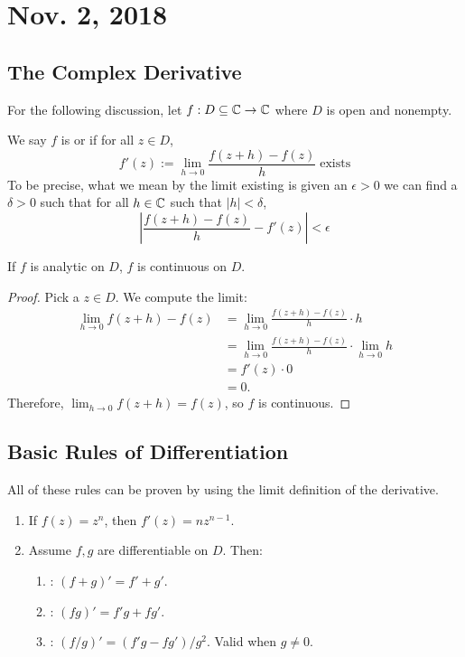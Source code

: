 \documentclass[notes]{subfile}
\begin{document}
\section{Nov. 2, 2018}
\subsection{The Complex Derivative}
For the following discussion, let $f: D \subseteq \operatorname{\mathbb{C}} \to \operatorname{\mathbb{C}}$ where $D$ is open and nonempty.

\begin{definition}
    We say $f$ is  or  if for all $z \in D$,
    \[ f'(z) := \lim_{h \to 0} \frac{f(z+h) - f(z)}{h} \; \text{exists} \]
    To be precise, what we mean by the limit existing is given an $\epsilon > 0$ 
    we can find a $\delta > 0$ such that for all $h \in \operatorname{\mathbb{C}}$ such that $|h| < \delta$,
    \[ \left| \frac{f(z+h) - f(z)}{h} - f'(z) \right| < \epsilon \] 

\end{definition}

\begin{theorem}
    If $f$ is analytic on $D$, $f$ is continuous on $D$.
\end{theorem}

\begin{proof}
    Pick a $z \in D$.
    We compute the limit:
    \begin{align*}
        \lim_{h \to 0} f(z+h) - f(z) &= \lim_{h\to 0} \frac{f(z+h)-f(z)}{h} \cdot h \\
        &= \lim_{h \to 0} \frac{f(z+h)-f(z)}{h} \cdot \lim_{h\to 0} h \\
        &= f'(z) \cdot 0 \\
        &= 0.
    \end{align*}
    Therefore, $\lim_{h \to 0} f(z+h) = f(z)$, so $f$ is continuous.
\end{proof}

\subsection{Basic Rules of Differentiation}
All of these rules can be proven by using the limit definition of the derivative.
\begin{enumerate}
    \item If $f(z) = z^n$, then $f'(z) = nz^{n-1}$.
    \item Assume $f,g$ are differentiable on $D$. Then:
    \begin{enumerate}
        \item {}: $(f + g)' = f' + g'$.
        \item {}: $(fg)' = f'g + fg'$.
        \item {}: $(f/g)' = (f'g - fg')/g^2$.  
        Valid when $g \ne 0$.
    \end{enumerate}
\end{enumerate}
\end{document}
